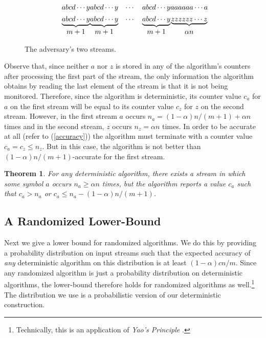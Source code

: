 \documentclass[charterfonts,lotsofwhite]{patmorin}
\newcommand{\figlabel}[1]{\label{fig:#1}}
\newtheorem{thm}{Theorem}{\bfseries}{\itshape}
\begin{document}
\begin{figure}
\begin{minipage}{\textwidth}
\[
  \begin{array}{c@{}ccc@{}c@{}c}
    abcd\cdots y & abcd\cdots y & \cdots & abcd\cdots y & aaaaaa\cdots a \\[1ex]
    \underbrace{abcd\cdots y} & 
    \underbrace{abcd\cdots y} & \cdots & \underbrace{abcd\cdots y} & 
    \underbrace{zzzzzz\cdots z} \\
  m+1 & m+1 && m+1 & \alpha n 
  \end{array}
\]
\end{minipage}
\caption{The adversary's two streams.}\figlabel{stream}
\end{figure}

Observe that, since neither $a$ nor $z$ is stored in any of the
algorithm's counters after processing the first part of the stream,
the only information the algorithm obtains by reading the last element
of the stream is that it is not being monitored.  Therefore, since the
algorithm is deterministic, its counter value $c_a$ for $a$ on the
first stream will be equal to its counter value $c_z$ for $z$ on the
second stream.  However, in the first stream $a$ occurs
$n_a=(1-\alpha)n/(m+1)+\alpha n$ times and in the second stream, $z$
occurs $n_z=\alpha n$ times.  In order to be accurate at all (refer to
(\ref{accuracy})) the algorithm must terminate with a counter value
$c_a=c_z\le n_z$.  But in this case, the algorithm is not better than
$(1-\alpha)n/(m+1)$-accurate for the first stream.

\begin{thm}
For any deterministic algorithm, there exists a stream in which some
symbol $a$ occurs $n_a\ge\alpha n$ times, but the algorithm reports a
value $c_a$ such that $c_a>n_a$ or $c_a \le n_a-(1-\alpha)n/(m+1)$.
\end{thm}

\subsection{A Randomized Lower-Bound}

Next we give a lower bound for randomized algorithms.  We do this by
providing a probability distribution on input streams such that the
expected accuracy of \emph{any} deterministic algorithm on this
distribution is at least $(1-\alpha)cn/m$.  Since any randomized
algorithm is just a probability distribution on deterministic
algorithms, the lower-bound therefore holds for randomized algorithms
as well.\footnote{Technically, this is an application of \emph{Yao's
Principle} \cite{y77}.}  The distribution we use is a probabilistic
version of our deterministic construction.
\end{document}
